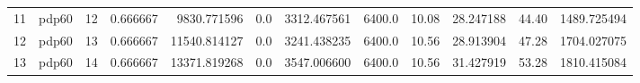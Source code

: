 \begin{tabular}{llrrrrrrrrrr}
11 &   pdp60 &        12 &  0.666667 &      9830.771596 &           0.0 &   3312.467561 &       6400.0 &             10.08 &         28.247188 &            44.40 &        1489.725494 \\
12 &   pdp60 &        13 &  0.666667 &     11540.814127 &           0.0 &   3241.438235 &       6400.0 &             10.56 &         28.913904 &            47.28 &        1704.027075 \\
13 &   pdp60 &        14 &  0.666667 &     13371.819268 &           0.0 &   3547.006600 &       6400.0 &             10.56 &         31.427919 &            53.28 &        1810.415084 \\
\bottomrule
\end{tabular}

